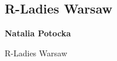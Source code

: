 \documentclass[\main/boa.tex]{subfiles}
\begin{document}
\subsection{R-Ladies Warsaw}

\begin{minipage}{0.915\textwidth}
	\centering
  {\bf {} Natalia Potocka}
\end{minipage}

\vskip 0.3cm

\begin{affiliations}
\begin{minipage}{0.915\textwidth}
\centering
R-Ladies Warsaw \\[-2pt]
\end{minipage}
\end{affiliations}

\vskip 0.8cm
\end{document}
